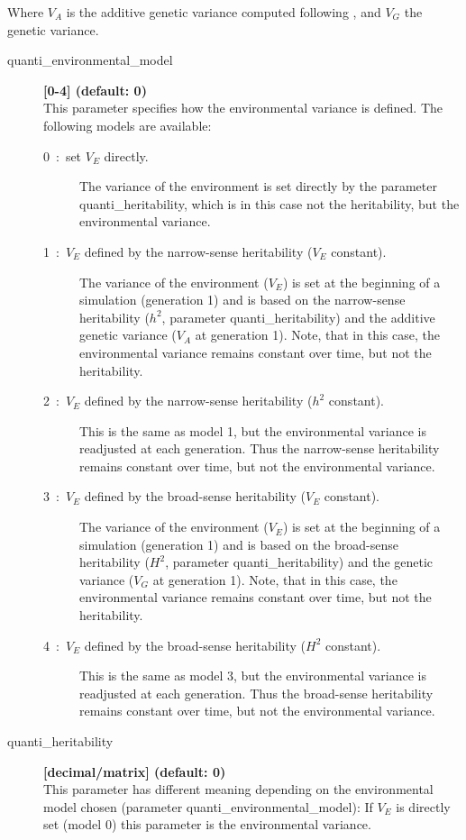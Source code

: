 \documentclass[letterpaper,12pt,oneside]{book}
\begin{document}
Where $V_{A}$ is the additive genetic variance computed following \citep[p85-87]{Lynch_1998}, and $V_{G}$ the genetic variance.  
\begin{description}
\item[quanti\_environmental\_model] \textbf{[0-4] (default: 0)}\\
This parameter specifies how the environmental variance is defined. The following models are available:
\begin{description}
\item [0~:~set $V_{E}$ directly.] The variance of the environment is set directly by the parameter \textsf{quanti\_heritability}, which is in this case not the heritability, but the environmental variance.
\item [1~:~$V_{E}$ defined by the narrow-sense heritability ($V_{E}$ constant).] The variance of the environment ($V_{E}$) is set at the beginning of a simulation (generation 1) and is based on the narrow-sense heritability ($h^{2}$, parameter \textsf{quanti\_heritability}) and the additive genetic variance ($V_{A}$ at generation 1). Note, that in this case, the environmental variance remains constant over time, but not the heritability.
\item [2~:~$V_{E}$ defined by the narrow-sense heritability ($h^{2}$ constant).] This is the same as model 1, but the environmental variance is readjusted at each generation. Thus the narrow-sense heritability remains constant over time, but not the environmental variance. 
\item [3~:~$V_{E}$ defined by the broad-sense heritability ($V_{E}$ constant).] The variance of the environment ($V_{E}$) is set at the beginning of a simulation (generation 1) and is based on the broad-sense heritability ($H^{2}$, parameter \textsf{quanti\_heritability}) and the genetic variance ($V_{G}$ at generation 1). Note, that in this case, the environmental variance remains constant over time, but not the heritability.
\item [4~:~$V_{E}$ defined by the broad-sense heritability ($H^{2}$ constant).] This is the same as model 3, but the environmental variance is readjusted at each generation. Thus the broad-sense heritability remains constant over time, but not the environmental variance. 
\end{description}

\item[quanti\_heritability] \textbf{[decimal/matrix] (default: 0)}\\
This parameter has different meaning depending on the environmental model chosen (parameter \linebreak\textsf{quanti\_environmental\_model}): If $V_{E}$ is directly set (model 0) this parameter is the environmental variance. 


\end{description}
\end{document}
